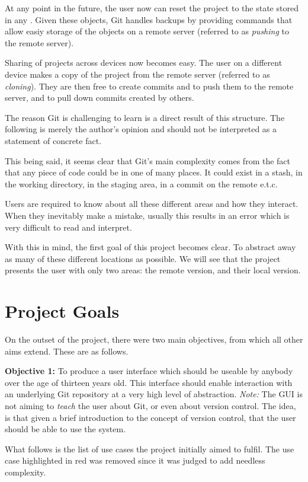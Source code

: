 At any point in the future, the user now can reset the project to the state stored in any \commit. Given these objects, Git handles backups by providing commands that allow easiy storage of the objects on a remote server (referred to as \emph{pushing} to the remote server). 

Sharing of projects across devices now becomes easy. The user on a different device makes a copy of the project from the remote server (referred to as \emph{cloning}). They are then free to create commits and to push them to the remote server, and to pull down commits created by others.

The reason Git is challenging to learn is a direct result of this structure. The following is merely the author's opinion and should not be interpreted as a statement of concrete fact.

This being said, it seems clear that Git's main complexity comes from the fact that any piece of code could be in one of many places. It could exist in a stash, in the working directory, in the staging area, in a commit on the remote e.t.c.

Users are required to know about all these different areas and how they interact. When they inevitably make a mistake, usually this results in an error which is very difficult to read and interpret. 

With this in mind, the first goal of this project becomes clear. To abstract away as many of these different locations as possible. We will see that the project presents the user with only two areas: the remote version, and their local version.

\section{Project Goals}

On the outset of the project, there were two main objectives, from which all other aims extend. These are as follows.

\noindent \textbf{Objective 1:} To produce a user interface which should be useable by anybody over the age of thirteen years old. This interface should enable interaction with an underlying Git repository at a very high level of abstraction. \emph{Note:} The GUI is not aiming to \emph{teach} the user about Git, or even about version control. The idea, is that given a brief introduction to the concept of version control, that the user should be able to use the system.

What follows is the list of use cases the project initially aimed to fulfil. The use case highlighted in red was removed since it was judged to add needless complexity.

